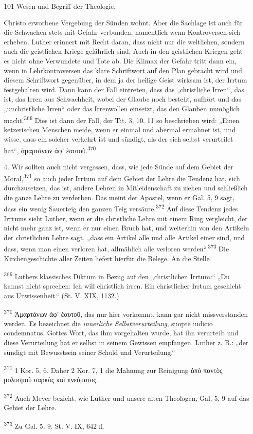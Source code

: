 \centerline{101 \qquad Wesen und Begriff der Theologie.}

Christo erworbene Vergebung der Sünden wohnt. Aber die Sachlage ist auch für die Schwachen stets mit Gefahr verbunden, namentlich wenn Kontroversen sich erheben. Luther erinnert mit Recht daran, dass nicht nur die weltlichen, sondern auch die geistlichen Kriege gefährlich sind. Auch in den geistlichen Kriegen geht es nicht ohne Verwundete und Tote ab. Die Klimax der Gefahr tritt dann ein, wenn in Lehrkontroversen das klare Schriftwort auf den Plan gebracht wird und diesem Schriftwort gegenüber, in dem ja der heilige Geist wirksam ist, der Irrtum festgehalten wird. Dann kann der Fall eintreten, dass das „christliche Irren“, das ist, das Irren aus Schwachheit, wobei der Glaube noch besteht, aufhört und das „unchristliche Irren“ oder das Irrenwollen einsetzt, das den Glauben unmöglich macht.\textsuperscript{369}
Dies ist dann der Fall, der Tit. 3, 10. 11 so beschrieben wird: „Einen ketzerischen Menschen meide, wenn er einmal und abermal ermahnet ist, und wisse, dass ein solcher verkehrt ist und sündigt, als der sich selbst verurteilet hat“, \textgreek{ἁμαρτάνων ἀφ' ἑαυτοῦ}.\textsuperscript{370}

4. Wir sollten auch nicht vergessen, dass, wie jede Sünde auf dem Gebiet der Moral,\textsuperscript{371} so auch jeder Irrtum auf dem Gebiet der Lehre die Tendenz hat, sich durchzusetzen, das ist, andere Lehren in Mitleidenschaft zu ziehen und schließlich die ganze Lehre zu verderben. Das meint der Apostel, wenn er Gal. 5, 9 sagt, dass ein wenig Sauerteig den ganzen Teig versäure.\textsuperscript{372} Auf diese Tendenz jedes Irrtums sieht Luther, wenn er die christliche Lehre mit einem Ring vergleicht, der nicht mehr ganz ist, wenn er nur einen Bruch hat, und weiterhin von den Artikeln der christlichen Lehre sagt, „dass ein Artikel alle und alle Artikel einer sind, und dass, wenn man einen verloren hat, allmählich alle verloren werden“.\textsuperscript{373} Die Kirchengeschichte aller Zeiten liefert hierfür die Belege. An die Stelle

\begingroup
\small
\noindent \textsuperscript{369} Luthers klassisches Diktum in Bezug auf den „christlichen Irrtum:“ „Du kannst nicht sprechen: Ich will christlich irren. Ein christlicher Irrtum geschieht aus Unwissenheit.“ (St. V. XIX, 1132.)

\noindent \textsuperscript{370} \textgreek{Ἁμαρτάνων ἀφ' ἑαυτοῦ}, das nur hier vorkommt, kann gar nicht missverstanden werden. Es bezeichnet die \emph{innerliche Selbstverurteilung}, suopte iudicio condemnatus. Gottes Wort, das ihm vorgehalten wurde, hat ihn verurteilt und diese Verurteilung hat er selbst in seinem Gewissen empfangen. Luther z. B.: „der sündigt mit Bewusstsein seiner Schuld und Verurteilung.“

\noindent \textsuperscript{371} 1 Kor. 5, 6. Daher 2 Kor. 7, 1 die Mahnung zur Reinigung \textgreek{ἀπὸ παντὸς μολυσμοῦ σαρκὸς καὶ πνεύματος}.

\noindent \textsuperscript{372} Auch Meyer bezieht, wie Luther und unsere alten Theologen, Gal. 5, 9 auf das Gebiet der Lehre.

\noindent \textsuperscript{373} Zu Gal. 5, 9. St. V. IX, 642 ff.
\endgroup